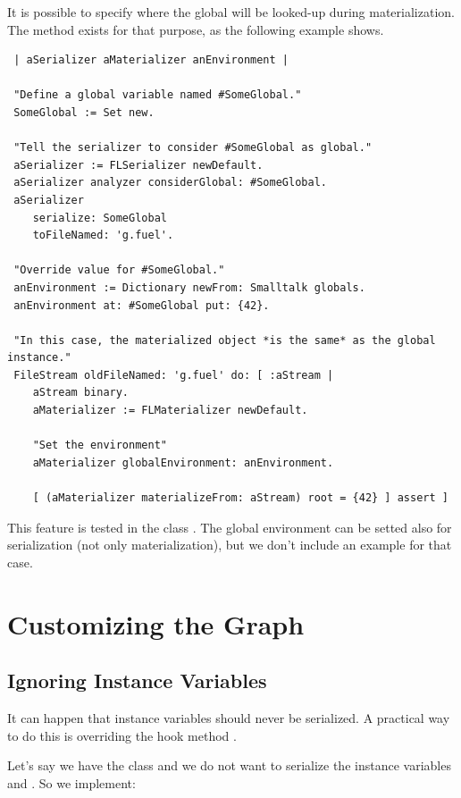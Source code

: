 \documentclass[a4paper,10pt,twoside]{book}
\begin{document}
It is possible to specify where the global will be looked-up during materialization. The method  exists for that purpose, as the following example shows. 

\begin{lstlisting}
 | aSerializer aMaterializer anEnvironment |
 
 "Define a global variable named #SomeGlobal."
 SomeGlobal := Set new.
 
 "Tell the serializer to consider #SomeGlobal as global."
 aSerializer := FLSerializer newDefault.
 aSerializer analyzer considerGlobal: #SomeGlobal.
 aSerializer 
 	serialize: SomeGlobal 
 	toFileNamed: 'g.fuel'.
 
 "Override value for #SomeGlobal."
 anEnvironment := Dictionary newFrom: Smalltalk globals.
 anEnvironment at: #SomeGlobal put: {42}.
 
 "In this case, the materialized object *is the same* as the global instance."
 FileStream oldFileNamed: 'g.fuel' do: [ :aStream |
 	aStream binary.
 	aMaterializer := FLMaterializer newDefault.
 	
 	"Set the environment"
 	aMaterializer globalEnvironment: anEnvironment.
 
 	[ (aMaterializer materializeFrom: aStream) root = {42} ] assert ]
\end{lstlisting}

This feature is tested in the class . The global environment can be setted also for serialization (not only materialization), but we don't include an example for that case.



\section{Customizing the Graph}

\subsection{Ignoring Instance Variables}

It can happen that instance variables should never be serialized. A practical way to do this is overriding the hook method . 

Let's say we have the class  and we do not want to serialize the instance variables  and . So we implement:
\end{document}

